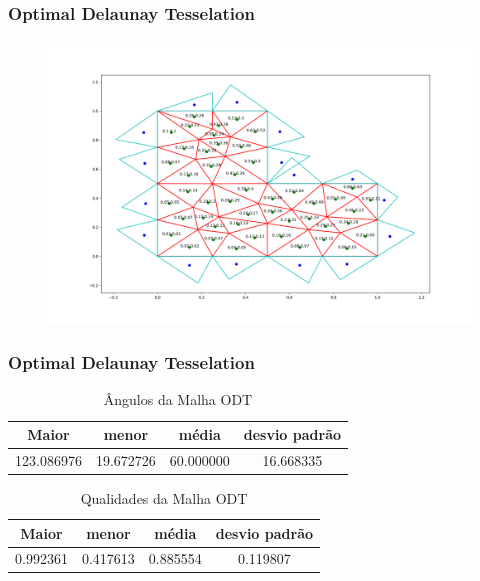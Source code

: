 \documentclass{beamer}
\begin{document}
\begin{frame}
  \frametitle{Optimal Delaunay Tesselation}

  \begin{figure}
    \includegraphics[width=0.6\linewidth]{malha-odt.png}
  \end{figure}

\end{frame}
\begin{frame}
  \frametitle{Optimal Delaunay Tesselation}

  \begin{table}[hb]
    \centering
    \par\caption{Ângulos da Malha ODT}
    \begin{tabular}{c|c|c|c}
      Maior      & menor     & média     & desvio padrão \\\hline\hline
      123.086976 & 19.672726 & 60.000000 & 16.668335     \\\hline
    \end{tabular}
    \label{tab:angulos-malha-odt}
  \end{table}

  \begin{table}[hb]
    \centering
    \par\caption{Qualidades da Malha ODT}
    \begin{tabular}{c|c|c|c}
      Maior    & menor    & média    & desvio padrão \\\hline\hline
      0.992361 & 0.417613 & 0.885554 & 0.119807      \\\hline
    \end{tabular}
    \label{tab:qualidades-malha-odt}
  \end{table}

\end{frame}
\end{document}
